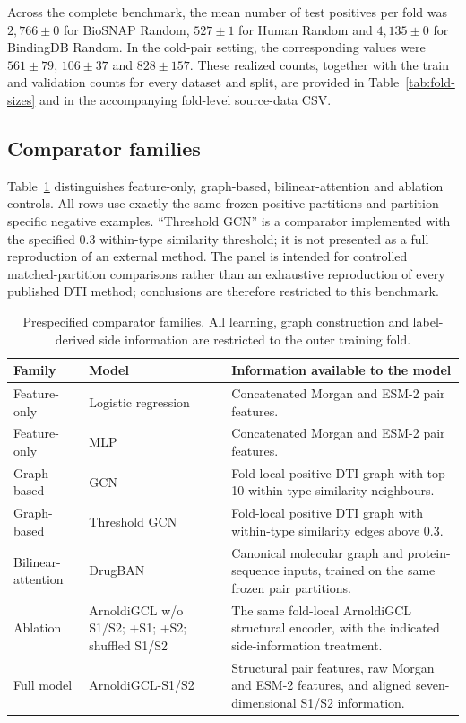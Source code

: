 Across the complete benchmark, the mean number of test positives per fold
was $2,766 \pm 0$ for BioSNAP Random, $527 \pm 1$ for Human Random and
$4,135 \pm 0$ for BindingDB Random. In the cold-pair setting, the
corresponding values were $561 \pm 79$, $106 \pm 37$ and $828 \pm 157$.
These realized counts, together with the train and validation counts for
every dataset and split, are provided in Table~\ref{tab:fold-sizes} and in
the accompanying fold-level source-data CSV.

\subsection{Comparator families}
Table~\ref{tab:comparators} distinguishes feature-only, graph-based,
bilinear-attention and ablation controls. All rows use exactly the same frozen
positive partitions and partition-specific negative examples. ``Threshold GCN''
is a comparator implemented with the specified 0.3 within-type similarity
threshold; it is not presented as a full reproduction of an external method.
The panel is intended for controlled matched-partition comparisons rather than
an exhaustive reproduction of every published DTI method; conclusions are
therefore restricted to this benchmark.

\begin{table}[t]
\centering
\scriptsize
\begin{tabular}{p{}p{}p{}}
\toprule
Family & Model & Information available to the model \\
\midrule
Feature-only & Logistic regression & Concatenated Morgan and ESM-2 pair features. \\
Feature-only & MLP & Concatenated Morgan and ESM-2 pair features. \\
Graph-based & GCN & Fold-local positive DTI graph with top-10 within-type similarity neighbours. \\
Graph-based & Threshold GCN & Fold-local positive DTI graph with within-type similarity edges above 0.3. \\
Bilinear-attention & DrugBAN & Canonical molecular graph and protein-sequence inputs, trained on the same frozen pair partitions. \\
Ablation & ArnoldiGCL w/o S1/S2; +S1; +S2; shuffled S1/S2 & The same fold-local ArnoldiGCL structural encoder, with the indicated side-information treatment. \\
Full model & ArnoldiGCL-S1/S2 & Structural pair features, raw Morgan and ESM-2 features, and aligned seven-dimensional S1/S2 information. \\
\bottomrule
\end{tabular}
\caption{Prespecified comparator families. All learning, graph construction
and label-derived side information are restricted to the outer training fold.}
\label{tab:comparators}
\end{table}

